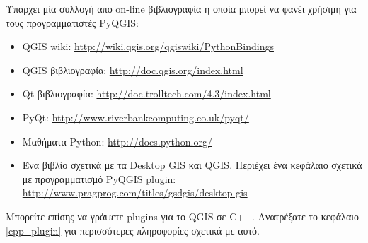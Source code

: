 Υπάρχει μία συλλογή απο on-line βιβλιογραφία η οποία μπορεί να φανέι χρήσιμη για τους προγραμματιστές PyQGIS:
 
\begin{itemize}
\item QGIS wiki: \url{http://wiki.qgis.org/qgiswiki/PythonBindings}
\item QGIS βιβλιογραφία: \url{http://doc.qgis.org/index.html}
\item Qt βιβλιογραφία: \url{http://doc.trolltech.com/4.3/index.html}
\item PyQt: \url{http://www.riverbankcomputing.co.uk/pyqt/}
\item Μαθήματα Python: \url{http://docs.python.org/}
\item Ένα βιβλίο σχετικά με τα Desktop GIS και QGIS. Περιέχει ένα κεφάλαιο σχετικά με προγραμματισμό PyQGIS plugin: \url{http://www.pragprog.com/titles/gsdgis/desktop-gis} 
\end{itemize}

Μπορείτε επίσης να γράψετε plugins για το QGIS σε C++. Ανατρέξατε το κεφάλαιο \ref{cpp_plugin} για περισσότερες πληροφορίες σχετικά με αυτό. 

